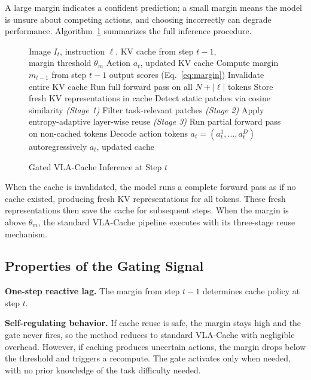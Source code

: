 \documentclass[letterpaper, 10 pt, conference]{ieeeconf}  %
\newcommand{\ourmethod}{Gated VLA-Cache}
\begin{document}
A large margin indicates a confident prediction; a small margin means
the model is unsure about competing actions, and choosing incorrectly can degrade performance.
Algorithm~\ref{alg:gated} summarizes the full inference procedure.
\begin{figure}[t]
\begin{algorithm}[H]
\caption{\ourmethod{} Inference at Step $t$}
\label{alg:gated}
\begin{algorithmic}[1]
\small
\REQUIRE Image $I_t$, instruction $\ell$, KV cache from step $t{-}1$, \\
    \hspace{1.5em} margin threshold $\theta_m$
\ENSURE Action $a_t$, updated KV cache
\STATE Compute margin $m_{t-1}$ from step $t{-}1$ output scores (Eq.~\ref{eq:margin})
    \STATE Invalidate entire KV cache
    \STATE Run full forward pass on all $N + |\ell|$ tokens
    \STATE Store fresh KV representations in cache
\ELSE
    \STATE Detect static patches via cosine similarity \textit{(Stage 1)}
    \STATE Filter task-relevant patches \textit{(Stage 2)}
    \STATE Apply entropy-adaptive layer-wise reuse \textit{(Stage 3)}
    \STATE Run partial forward pass on non-cached tokens
\ENDIF
\STATE Decode action tokens $a_t = (a_t^1, \dots, a_t^D)$ autoregressively
\RETURN $a_t$, updated cache
\end{algorithmic}
\end{algorithm}
\end{figure}
When the cache is invalidated, the model runs a complete forward pass as
if no cache existed, producing fresh KV representations for all tokens.
These fresh representations then save the cache for subsequent steps.
When the margin is above $\theta_m$, the standard VLA-Cache pipeline
executes with its three-stage reuse mechanism.

\subsection{Properties of the Gating Signal}

\textbf{One-step reactive lag.}
The margin from step $t{-}1$ determines cache policy at step $t$.

\textbf{Self-regulating behavior.}
If cache reuse is safe, the margin stays high and
the gate never fires, so the method reduces to standard VLA-Cache with
negligible overhead.
However, if caching produces uncertain actions, the margin drops below the threshold and triggers a recompute.
The gate activates only when needed, with no prior knowledge of the task difficulty needed.
\end{document}
